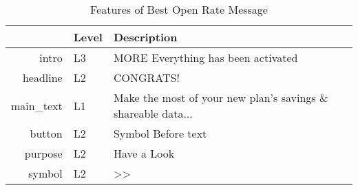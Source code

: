 \begin{table}[ht]
\centering
\caption{Features of Best Open Rate Message} 
\label{tab:best_open}
\begin{tabular}{rll}
  \hline
 & Level & Description \\ 
  \hline
intro & L3 & MORE Everything has been activated \\ 
  headline & L2 & CONGRATS! \\ 
  main\_text & L1 & Make the most of your new plan’s savings \& shareable data... \\ 
  button & L2 & Symbol Before text \\ 
  purpose & L2 & Have a Look \\ 
  symbol & L2 & >> \\ 
   \hline
\end{tabular}
\end{table}
